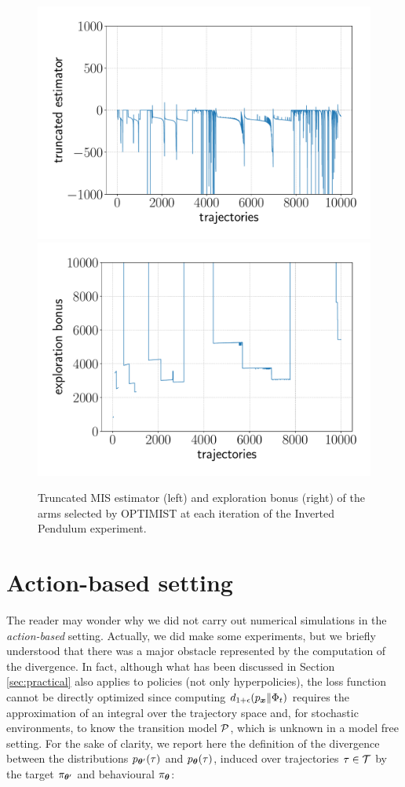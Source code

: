 \begin{figure}[t!] 
\centering
\includegraphics[width=.5\textwidth]{Images/IPmise.pdf}\hfill
\includegraphics[width=.5\textwidth]{Images/IPbonus.pdf}
\caption{Truncated \gls{MIS} estimator (left) and exploration bonus (right) of the arms selected by \gls{OPTIMIST} at each iteration of the Inverted Pendulum experiment.} 
\label{fig:IPbound}
\end{figure} 



\section{Action-based setting} \label{sec:actionbased}

The reader may wonder why we did not carry out numerical simulations in the \emph{action-based} setting. Actually, we did make some experiments, but we briefly understood that there was a major obstacle represented by the computation of the \Renyi divergence. In fact, although what has been discussed in Section \ref{sec:practical} also applies to policies (not only hyperpolicies), the loss function cannot be directly optimized since computing $d_{1+\epsilon}(p_{\boldsymbol{x}}\|\Phi_t)$ requires the approximation of an integral over the trajectory space and, for stochastic environments, to know the transition model $\mathcal{P}$, which is unknown in a model free setting. For the sake of clarity, we report here the definition of the \Renyi divergence between the distributions $p_{\boldsymbol{\theta}'}(\tau)$ and $p_{\boldsymbol{\theta}}(\tau)$, induced over trajectories $\tau\in\mathcal{T}$ by the target $\pi_{\boldsymbol{\theta}'}$ and behavioural $\pi_{\boldsymbol{\theta}}$: 

